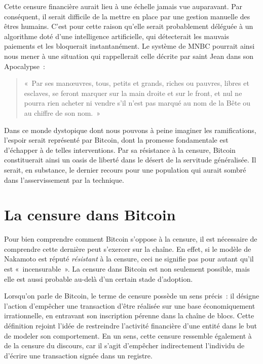 Cette censure financière aurait lieu à une échelle jamais vue auparavant. Par conséquent, il serait difficile de la mettre en place par une gestion manuelle des êtres humains. C'est pour cette raison qu'elle serait probablement déléguée à un algorithme doté d'une intelligence artificielle, qui détecterait les mauvais paiements et les bloquerait instantanément. Le système de MNBC pourrait ainsi nous mener à une situation qui rappellerait celle décrite par saint Jean dans son Apocalypse~:

\begin{quote}
«~Par ses manœuvres, tous, petits et grands, riches ou pauvres, libres et esclaves, se feront marquer sur la main droite et sur le front, et nul ne pourra rien acheter ni vendre s'il n'est pas marqué au nom de la Bête ou au chiffre de son nom.~»
\end{quote}

Dans ce monde dystopique dont nous pouvons à peine imaginer les ramifications, l'espoir serait représenté par Bitcoin, dont la promesse fondamentale est d'échapper à de telles interventions. Par sa résistance à la censure, Bitcoin constituerait ainsi un oasis de liberté dans le désert de la servitude généralisée. Il serait, en substance, le dernier recours pour une population qui aurait sombré dans l'asservissement par la technique.

\section*{La censure dans Bitcoin}

Pour bien comprendre comment Bitcoin s'oppose à la censure, il est nécessaire de comprendre cette dernière peut s'exercer sur la chaîne. En effet, si le modèle de Nakamoto est réputé \emph{résistant} à la censure, ceci ne signifie pas pour autant qu'il est «~incensurable~». La censure dans Bitcoin est non seulement possible, mais elle est aussi probable au-delà d'un certain stade d'adoption.

Lorsqu'on parle de Bitcoin, le terme de censure possède un sens précis~: il désigne l'action d'empêcher une transaction d'être réalisée sur une base économiquement irrationnelle, en entravant son inscription pérenne dans la chaîne de blocs. Cette définition rejoint l'idée de restreindre l'activité financière d'une entité dans le but de modeler son comportement. En un sens, cette censure ressemble également à de la censure du discours, car il s'agit d'empêcher indirectement l'individu de d'écrire une transaction signée dans un registre. %

